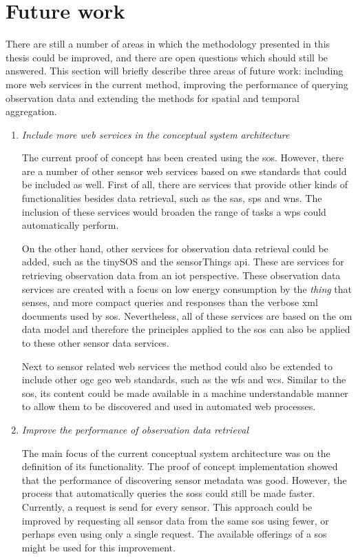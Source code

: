 \section{Future work}
\label{FW}
There are still a number of areas in which the methodology presented in this thesis could be improved, and there are open questions which should still be answered. This section will briefly describe three areas of future work: including more web services in the current method, improving the performance of querying observation data and extending the methods for spatial and temporal aggregation.

\begin{enumerate}
	\item \textit{Include more web services in the conceptual system architecture}
	\label{more}
	
	The current proof of concept has been created using the \ac{sos}. However, there are a number of other sensor web services based on \ac{swe} standards that could be included as well. First of all, there are services that provide other kinds of functionalities besides data retrieval, such as the \acf{sas}, \acf{sps} and \acf{wns}. The inclusion of these services would broaden the range of tasks a \ac{wps} could automatically perform. 
	
	On the other hand, other services for observation data retrieval could be added, such as the tinySOS and the sensorThings \ac{api}. These are services for retrieving observation data from an \ac{iot} perspective. These observation data services are created with a focus on low energy consumption by the \textit{thing} that senses, and more compact queries and responses than the verbose \ac{xml} documents used by \ac{sos}. Nevertheless, all of these services are based on the \ac{om} data model and therefore the principles applied to the \ac{sos} can also be applied to these other sensor data services.  
	
	Next to sensor related web services the method could also be extended to include other \ac{ogc} geo web standards, such as the \acf{wfs} and \acf{wcs}. Similar to the \ac{sos}, its content could be made available in a machine understandable manner to allow them to be discovered and used in automated web processes.    
	
	\item \textit{Improve the performance of observation data retrieval}
	\label{faster}
	
	The main focus of the current conceptual system architecture was on the definition of its functionality. The proof of concept implementation showed that the performance of discovering sensor metadata was good. However, the process that automatically queries the \aclp{sos} could still be made faster. Currently, a request is send for every sensor. This approach could be improved by requesting all sensor data from the same \ac{sos} using fewer, or perhaps even using only a single request. The available offerings of a \ac{sos} might be used for this improvement.      
	

\end{enumerate}
